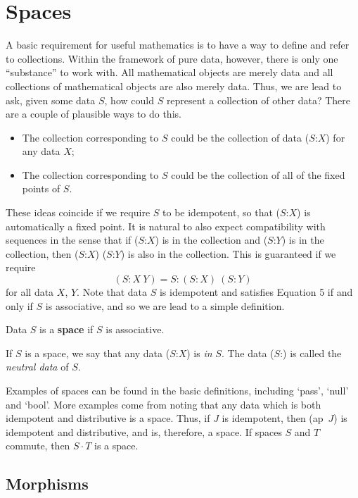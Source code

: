 \documentclass[11pt]{article}
\begin{document}
\section{Spaces}

      A basic requirement for useful mathematics is to have a way to define and refer to collections.  
Within the framework of pure data, however, there is only one ``substance'' to work with.  All mathematical objects are merely data and 
all collections of mathematical objects are also merely data.  
Thus, we are lead to ask, given some data $S$, how could $S$ represent a collection of other data?  
There are a couple of plausible ways to do this.  
\begin{itemize} 
\item The collection corresponding to $S$ could be the collection of data ($S$:$X$) for any data $X$;
\item The collection corresponding to $S$ could be the collection of all of the fixed points of $S$.  
\end{itemize}
These ideas coincide if we require $S$ to be idempotent, so that ($S$:$X$) is automatically a fixed point.  It is natural to also expect compatibility with 
sequences in the sense that if ($S$:$X$) is in the collection and ($S$:$Y$) is in the collection, then ($S$:$X$) ($S$:$Y$) is also in the collection.  
This is guaranteed if we require 
\begin{equation}
(S : X\ Y) = S : (S:X)\ (S:Y)
\end{equation}
for all data $X$, $Y$.  
Note that data $S$ is idempotent and satisfies Equation 5 if and only if $S$ is associative, and so we are lead 
to a simple definition.
\begin{definition} Data $S$ is a {\bf space} if $S$ is associative.
\end{definition}
\noindent If $S$ is a space, we say that any data ($S$:$X$) is {\it in} $S$.  
The data ($S$:) is called the {\it neutral data} of $S$.  

Examples of spaces can be found in the basic definitions, including `pass', `null' and `bool'.  More examples come from 
noting that any data which is both idempotent and distributive is a space.  Thus, if $J$ is idempotent, then (ap\ $J$) is idempotent and 
distributive, and is, therefore, a space.  If spaces $S$ and $T$ commute, then $S\cdot T$ is a space.    

\subsection{Morphisms} 
\end{document}

